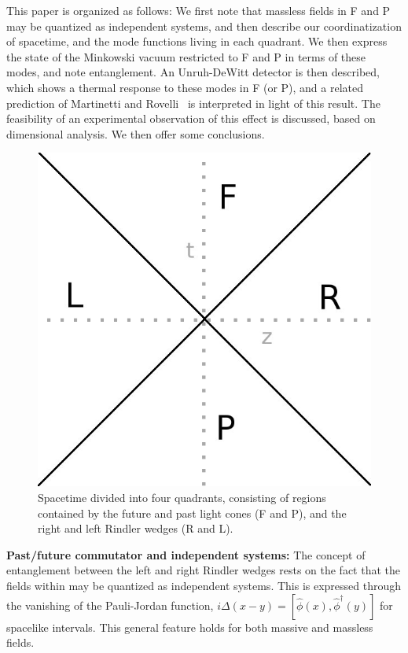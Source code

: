 \documentclass[aps,prl,twocolumn,showpacs]{revtex4}
\begin{document}
This paper is organized as follows:  We first note that massless fields in F and P may be quantized as independent systems, and then describe our coordinatization of spacetime, and the mode functions living in each quadrant.  We then express the state of the Minkowski vacuum restricted to F and P in terms of these modes, and note entanglement.  An Unruh-DeWitt detector is then described, which shows a thermal response to these modes in F (or P), and a related prediction of Martinetti and Rovelli~\cite{rovelli10} is interpreted in light of this result.  The feasibility of an experimental observation of this effect is discussed, based on dimensional analysis.  We then offer some conclusions.

\begin{figure}
 \centering
 \includegraphics[scale=0.25]{spacetime.jpg}
 \caption{Spacetime divided into four quadrants, consisting of regions contained by the future and past light cones (F and P), and the right and left Rindler wedges (R and L).}
 \label{fig:  Quadrants of Minkowski spacetime}
\end{figure}


\textbf{Past/future commutator and independent systems:}  The concept of entanglement between the left and right Rindler wedges rests on the fact that the fields within may be quantized as independent systems.  This is expressed through the vanishing of the Pauli-Jordan function, $i \Delta (x - y) = [\hat{\phi}(x) , \hat{\phi}^{\dagger}(y)]$ for spacelike intervals.  This general feature holds for both massive and massless fields.
\end{document}
